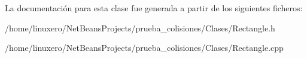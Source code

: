 La documentación para esta clase fue generada a partir de los siguientes ficheros\-:\begin{DoxyCompactItemize}
\item 
/home/linuxero/\-Net\-Beans\-Projects/prueba\-\_\-colisiones/\-Clases/Rectangle.\-h\item 
/home/linuxero/\-Net\-Beans\-Projects/prueba\-\_\-colisiones/\-Clases/Rectangle.\-cpp\end{DoxyCompactItemize}
